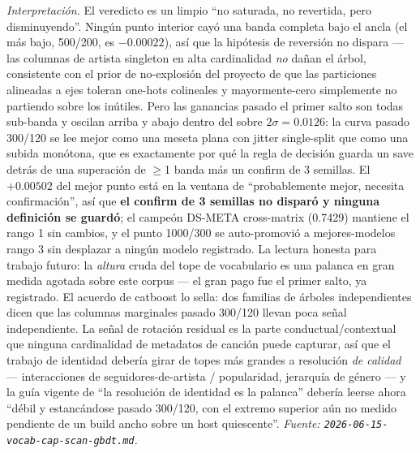 \documentclass[11pt]{article}
\begin{document}
\emph{Interpretación.} El veredicto es un limpio ``no saturada, no revertida, pero
disminuyendo''. Ningún punto interior cayó una banda completa bajo el ancla (el más
bajo, 500/200, es $-0.00022$), así que la hipótesis de reversión no dispara --- las
columnas de artista singleton en alta cardinalidad \emph{no} dañan el árbol,
consistente con el prior de no-explosión del proyecto de que las particiones
alineadas a ejes toleran one-hots colineales y mayormente-cero simplemente no
partiendo sobre los inútiles. Pero las ganancias pasado el primer salto son todas
sub-banda y oscilan arriba y abajo dentro del sobre $2\sigma=0.0126$: la curva
pasado 300/120 se lee mejor como una meseta plana con jitter single-split que como
una subida monótona, que es exactamente por qué la regla de decisión guarda un
save detrás de una superación de $\ge$1 banda más un confirm de 3 semillas. El
$+0.00502$ del mejor punto está en la ventana de ``probablemente mejor, necesita
confirmación'', así que \textbf{el confirm de 3 semillas no disparó y ninguna
definición se guardó}; el campeón DS-META cross-matrix (\num{0.7429}) mantiene el
rango 1 sin cambios, y el punto 1000/300 se auto-promovió a mejores-modelos rango 3
sin desplazar a ningún modelo registrado. La lectura honesta para trabajo futuro:
la \emph{altura} cruda del tope de vocabulario es una palanca en gran medida
agotada sobre este corpus --- el gran pago fue el primer salto, ya registrado. El
acuerdo de catboost lo sella: dos familias de árboles independientes dicen que las
columnas marginales pasado 300/120 llevan poca señal independiente. La señal de
rotación residual es la parte conductual/contextual que ninguna cardinalidad de
metadatos de canción puede capturar, así que el trabajo de identidad debería girar
de topes más grandes a resolución \emph{de calidad} --- interacciones de
seguidores-de-artista / popularidad, jerarquía de género --- y la guía vigente de
``la resolución de identidad es la palanca'' debería leerse ahora ``débil y
estancándose pasado 300/120, con el extremo superior aún no medido pendiente de un
build ancho sobre un host quiescente''.
\emph{Fuente: \texttt{2026-06-15-vocab-cap-scan-gbdt.md}.}
\end{document}
